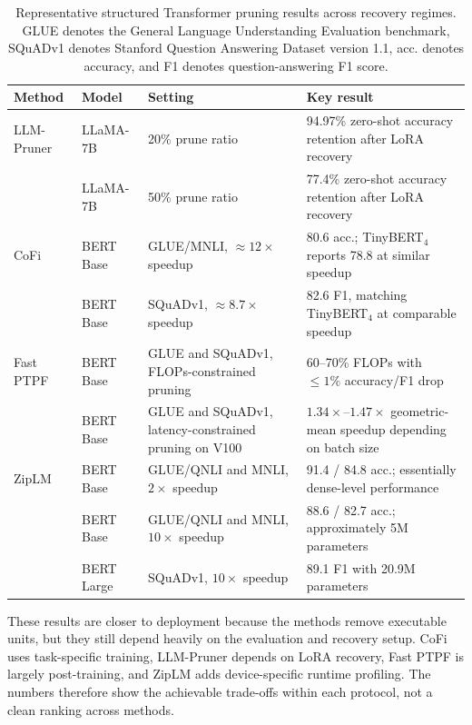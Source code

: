 \begin{table}[H]
	\centering
	\caption[Representative structured Transformer pruning results across recovery regimes.]{Representative structured Transformer pruning results across recovery regimes. GLUE denotes the General Language Understanding Evaluation benchmark, SQuADv1 denotes Stanford Question Answering Dataset version 1.1, acc. denotes accuracy, and F1 denotes question-answering F1 score.}
	\label{tab:structured_summary}
	\begin{tabular}{@{}llp{4.4cm}p{4.7cm}@{}}
		\toprule
		\textbf{Method} & \textbf{Model} & \textbf{Setting} & \textbf{Key result} \\
		\midrule
		LLM-Pruner \cite{ma2023llmpruner}
		  & LLaMA-7B & 20\% prune ratio & 94.97\% zero-shot accuracy retention after LoRA recovery \\
		  & LLaMA-7B & 50\% prune ratio & 77.4\% zero-shot accuracy retention after LoRA recovery \\
		\midrule
		CoFi \cite{xia2022structured}
		  & BERT Base & GLUE/MNLI, $\approx 12{\times}$ speedup & 80.6 acc.; TinyBERT$_4$ reports 78.8 at similar speedup \\
		  & BERT Base & SQuADv1, $\approx 8.7{\times}$ speedup & 82.6 F1, matching TinyBERT$_4$ at comparable speedup \\
		\midrule
		Fast PTPF \cite{kwon2022fast}
		  & BERT Base & GLUE and SQuADv1, FLOPs-constrained pruning & 60--70\% FLOPs with $\leq 1\%$ accuracy/F1 drop \\
		  & BERT Base & GLUE and SQuADv1, latency-constrained pruning on V100 & $1.34{\times}$--$1.47{\times}$ geometric-mean speedup depending on batch size \\
		\midrule
		ZipLM \cite{kurtic2023ziplm}
		  & BERT Base & GLUE/QNLI and MNLI, $2{\times}$ speedup & 91.4 / 84.8 acc.; essentially dense-level performance \\
		  & BERT Base & GLUE/QNLI and MNLI, $10{\times}$ speedup & 88.6 / 82.7 acc.; approximately 5M parameters \\
		  & BERT Large & SQuADv1, $10{\times}$ speedup & 89.1 F1 with 20.9M parameters \\
		\bottomrule
	\end{tabular}
\end{table}

These results are closer to deployment because the methods remove executable units, but they still depend heavily on the evaluation and recovery setup. CoFi uses task-specific training, LLM-Pruner depends on LoRA recovery, Fast PTPF is largely post-training, and ZipLM adds device-specific runtime profiling. The numbers therefore show the achievable trade-offs within each protocol, not a clean ranking across methods.


